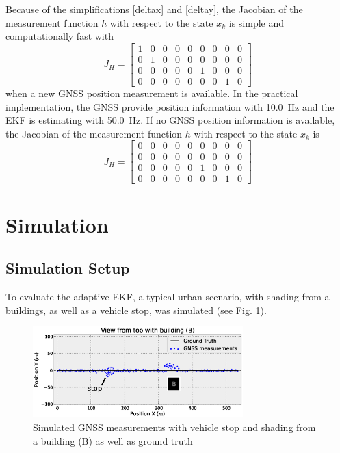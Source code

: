 \documentclass[conference]{IEEEtran}
\begin{document}
Because of the simplifications \eqref{deltax} and \eqref{deltay}, the Jacobian of the measurement function $h$ with respect to the state $x_k$ is simple and computationally fast with 
\begin{equation}\label{hgps}J_H=\left[\begin{matrix}1 & 0 & 0 & 0 & 0 & 0 & 0 & 0 & 0\\0 & 1 & 0 & 0 & 0 & 0 & 0 & 0 & 0\\0 & 0 & 0 & 0 & 0 & 1 & 0 & 0 & 0\\0 & 0 & 0 & 0 & 0 & 0 & 0 & 1 & 0\end{matrix}\right]\end{equation}
when a new GNSS position measurement is available. In the practical implementation, the GNSS provide position information with \SI{10.0}{\hertz} and the EKF is estimating with \SI{50.0}{\hertz}. If no GNSS position information is available, the Jacobian of the measurement function $h$ with respect to the state $x_k$ is
\begin{equation}J_H=\left[\begin{matrix}0 & 0 & 0 & 0 & 0 & 0 & 0 & 0 & 0\\0 & 0 & 0 & 0 & 0 & 0 & 0 & 0 & 0\\0 & 0 & 0 & 0 & 0 & 1 & 0 & 0 & 0\\0 & 0 & 0 & 0 & 0 & 0 & 0 & 1 & 0\end{matrix}\right]\end{equation}

\section{Simulation}

\subsection{Simulation Setup}

To evaluate the adaptive EKF, a typical urban scenario, with shading from a buildings, as well as a vehicle stop, was simulated (see Fig. \ref{Testdata}).

\begin{figure}[ht]
\centering
\includegraphics[width=3.2in]{images/Testdata}
\caption{Simulated GNSS measurements with vehicle stop and shading from a building (B) as well as ground truth}
\label{Testdata}
\end{figure}
\end{document}
